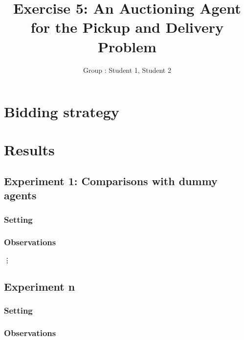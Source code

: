 \documentclass[11pt]{article}
\title{\bf Exercise 5: An Auctioning Agent for the Pickup and Delivery Problem}
\author{Group \textnumero: Student 1, Student 2}
\begin{document}
\maketitle

\section{Bidding strategy}

\section{Results}

\subsection{Experiment 1: Comparisons with dummy agents}

\subsubsection{Setting}

\subsubsection{Observations}

\vdots

\subsection{Experiment n}

\subsubsection{Setting}

\subsubsection{Observations}
\end{document}
